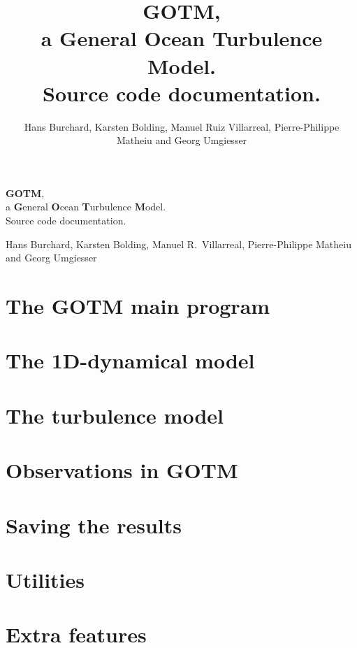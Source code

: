 \documentclass[a4paper,fleqn]{article}
\title{{\bf GOTM}, \\ a {\bf G}eneral {\bf O}cean {\bf T}urbulence
{\bf M}odel. \\ Source code documentation.}
\author{\sc Hans Burchard, Karsten Bolding, Manuel Ruiz Villarreal, Pierre-Philippe Matheiu and Georg Umgiesser}
\begin{document}
\thispagestyle{empty}

{\LARGE
\begin{center}
{\bf GOTM}, 
\\ a {\bf G}eneral {\bf O}cean {\bf T}urbulence {\bf M}odel. 
\\ Source code documentation.
\end{center}
}

{\large
\begin{center}
{\sc Hans Burchard, Karsten Bolding, Manuel R.\ Villarreal, Pierre-Philippe Matheiu and Georg Umgiesser}
\end{center}
}

\newpage
\tableofcontents
\newpage


\section{The GOTM main program}


\section{The 1D-dynamical model}


\section{The turbulence model}


\section{Observations in GOTM}


\section{Saving the results}


\section{Utilities}


\section{Extra features}


\end{document}
